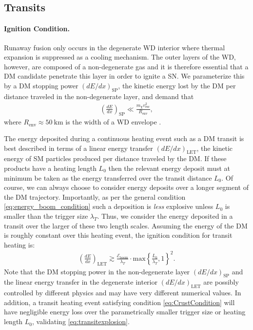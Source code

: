 \documentclass[preprintnumbers,amsmath,amssymb,prd,superscriptaddress]{revtex4}
\newcommand{\Eboom}{\mathcal{E}_\text{boom}}
\begin{document}

\subsection{Transits}

\paragraph{Ignition Condition.}
Runaway fusion only occurs in the degenerate WD interior where thermal expansion is suppressed as a cooling mechanism.
The outer layers of the WD, however, are composed of a non-degenerate gas and it is therefore essential that a DM candidate penetrate this layer in order to ignite a SN.
We parameterize this by a DM stopping power $(dE/dx)_\text{SP}$, the kinetic energy lost by the DM per distance traveled in the non-degenerate layer, and demand that
\begin{align}
\label{eq:CrustCondition}
  \left( \frac{d E}{d x} \right)_\text{SP} \ll
  \frac{m_\chi v^2_\text{esc}}{R_\text{env}},
\end{align}
where $R_\text{env} \approx 50 ~\text{km}$ is the width of a WD envelope \cite{KippenhahnWeigert}.

The energy deposited during a continuous heating event such as a DM transit is best described in terms of a linear energy transfer $(dE/dx)_\text{LET}$, the kinetic energy of SM particles produced per distance traveled by the DM.
If these products have a heating length $L_0$ then the relevant energy deposit must at minimum be taken as the energy transferred over the transit distance $L_0$.
Of course, we can always choose to consider energy deposits over a longer segment of the DM trajectory.
Importantly, as per the general condition \eqref{eq:energy_boom_condition} such a deposition is \emph{less} explosive unless $L_0$ is smaller than the trigger size $\lambda_T$.
Thus, we consider the energy deposited in a transit over the larger of these two length scales.
Assuming the energy of the DM is roughly constant over this heating event, the ignition condition for transit heating is:
\begin{align}
\label{eq:transitexplosion}
  \left( \frac{d E}{d x} \right)_\text{LET} \gtrsim
  \frac{\Eboom}{\lambda_T} \cdot \text{max}
  \left\{\frac{L_0}{\lambda_T}, 1 \right\}^2.
\end{align}
Note that the DM stopping power in the non-degenerate layer $(dE/dx)_\text{SP}$ and the linear energy transfer in the degenerate interior $(dE/dx)_\text{LET}$ are possibly controlled by different physics and may have very different numerical values.
In addition, a transit heating event satisfying condition \eqref{eq:CrustCondition} will have negligible energy loss over the parametrically smaller trigger size or heating length $L_0$, validating \eqref{eq:transitexplosion}.
\end{document}
